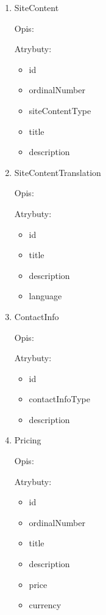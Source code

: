 \begin{enumerate}[label={\textbf{KAT/\protect\threedigits{\theenumi}}}, wide, labelwidth=!, labelindent=0pt]
    \item \label{kat:SiteContent} SiteContent

    Opis: \lipsum[1]
    \par
    Atrybuty:
    \begin{itemize}
        \item id
        \item ordinalNumber
        \item siteContentType
        \item title
        \item description
    \end{itemize}

    \item \label{kat:SiteContentTranslation} SiteContentTranslation

    Opis: \lipsum[1]
    \par
    Atrybuty:
    \begin{itemize}
        \item id
        \item title
        \item description
        \item language
    \end{itemize}

    \item \label{kat:ContactInfo} ContactInfo

    Opis: \lipsum[1]
    \par
    Atrybuty:
    \begin{itemize}
        \item id
        \item contactInfoType
        \item description
    \end{itemize}

    \item \label{kat:Pricing} Pricing

    Opis: \lipsum[1]
    \par
    Atrybuty:
    \begin{itemize}
        \item id
        \item ordinalNumber
        \item title
        \item description
        \item price
        \item currency
    \end{itemize}


\end{enumerate}
